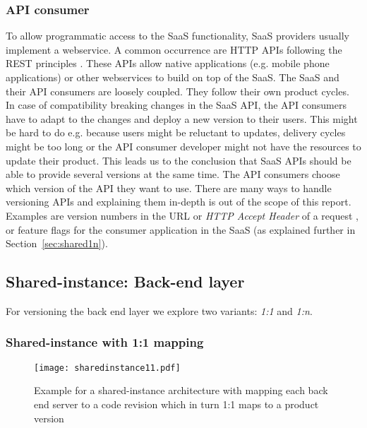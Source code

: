 \subsubsection{API consumer} To allow programmatic access to the SaaS functionality, SaaS providers usually implement a webservice. A common occurrence are HTTP APIs following the REST principles \cite{Fielding2000}. These APIs allow native applications (e.g. mobile phone applications) or other webservices to build on top of the SaaS. The SaaS and their API consumers are loosely coupled. They follow their own product cycles. In case of compatibility breaking changes in the SaaS API, the API consumers have to adapt to the changes and deploy a new version to their users. This might be hard to do e.g. because users might be reluctant to updates, delivery cycles might be too long or the API consumer developer might not have the resources to update their product. This leads us to the conclusion that SaaS APIs should be able to provide several versions at the same time. The API consumers choose which version of the API they want to use. There are many ways to handle versioning APIs and explaining them in-depth is out of the scope of this report. Examples are version numbers in the URL or \emph{HTTP Accept Header} of a request \cite{RFC2616}, or feature flags for the consumer application in the SaaS \cite{playbook2013} (as explained further in Section~\ref{sec:shared1n}).


\subsection{Shared-instance: Back-end layer}
\label{sec:backend}

For versioning the back end layer we explore two variants: \emph{1:1} and \emph{1:n}.

\subsubsection{Shared-instance with 1:1 mapping}
\label{sec:backend11}

\begin{figure}[h!]
\centering
\texttt{[image: sharedinstance11.pdf]}
\caption{Example for a shared-instance architecture with mapping each back end server to a code revision which in turn 1:1 maps to a product version}
\label{fig:sharedinstance11}
\end{figure}

